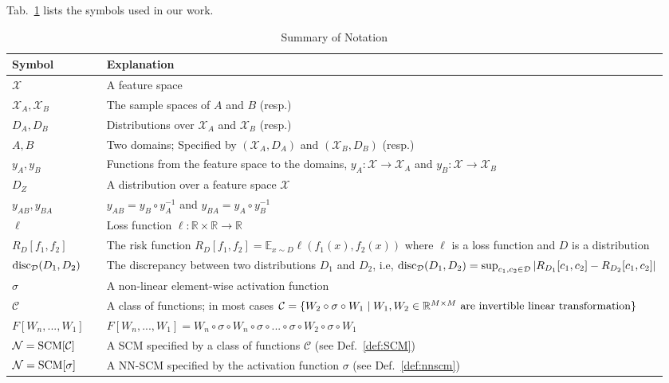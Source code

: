 \documentclass{article} %
\newcommand{\disc}{\textnormal{disc}}
\begin{document}
Tab.~\ref{tab:summary} lists the symbols used in our work.%
\begin{table}[htbp]\caption{Summary of Notation}\label{tab:summary}
\begin{center}

\begin{tabular}{l c p{10cm} }
\toprule
Symbol & & Explanation\\
\midrule
$\mathcal{X}$ & & A feature space\\
$\mathcal{X}_A,\mathcal{X}_B$ &  & The sample spaces of $A$ and $B$ (resp.)\\
$D_A,D_B$ &  & Distributions over $\mathcal{X}_A$ and $\mathcal{X}_B$ (resp.)\\ 
$A,B$ &  & Two domains; Specified by $(\mathcal{X}_A, D_A)$ and $(\mathcal{X}_B, D_B)$ (resp.)\\ 
$y_A,y_B$ &  & Functions from the feature space to the domains, $y_A: \mathcal{X} \rightarrow \mathcal{X}_A$ and $y_B: \mathcal{X} \rightarrow \mathcal{X}_B$\\ 
$D_Z$ &  & A distribution over a feature space $\mathcal{X}$\\ 
$y_{AB},y_{BA}$ &  & $y_{AB}=y_B\circ y^{-1}_A$ and $y_{BA} = y_A \circ y^{-1}_B$\\
$\ell$ & & Loss function $\ell : \mathbb{R} \times \mathbb{R} \rightarrow \mathbb{R}$ \\
$R_D[f_1,f_2]$ &  & The risk function $R_D[f_1,f_2] = \mathbb{E}_{x\sim D}\ell(f_1(x),f_2(x))$ where $\ell$ is a loss function and $D$ is a distribution\\
$\disc_{\mathcal{D}}(D_1,D_2)$ &  & The discrepancy between two distributions $D_1$ and $D_2$, i.e, $\disc_{\mathcal{D}}(D_1,D_2) = \sup_{c_1,c_2\in \mathcal{D}}|R_{D_1}[c_1,c_2]-R_{D_2}[c_1,c_2]|$\\
$\sigma$ & & A non-linear element-wise activation function\\
$\mathcal{C}$ & & A class of functions; in most cases $\mathcal{C} = \{W_2 \circ \sigma \circ W_1 \;\vert\; W_1,W_2 \in \mathbb{R}^{M\times M} \textnormal{ are invertible linear transformation}\}$\\
$F[W_{n},...,W_1]$ & & $F[W_{n},...,W_1] = W_{n} \circ \sigma \circ W_n \circ \sigma \circ ... \circ \sigma \circ W_2 \circ \sigma \circ W_1$\\
$\mathcal{N}=\textnormal{SCM}[\mathcal{C}]$ &  & A SCM specified by a class of functions $\mathcal{C}$ (see Def.~\ref{def:SCM})\\
$\mathcal{N}=\textnormal{SCM}[\sigma]$ &  & A NN-SCM specified by the activation function $\sigma$ (see Def.~\ref{def:nnscm})\\

\end{tabular}
\end{center}
\end{table}
\end{document}
